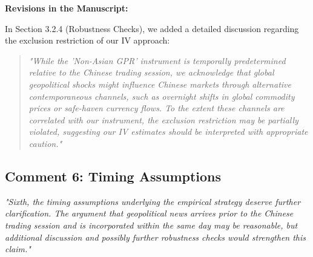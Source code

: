 \documentclass[12pt]{article}
\begin{document}
\begin{highlightbox}
\textbf{Revisions in the Manuscript:}

In Section 3.2.4 (Robustness Checks), we added a detailed discussion regarding the exclusion restriction of our IV approach:
\vspace{0.2cm}
\begin{quote}
\color{red}\itshape "While the 'Non-Asian GPR' instrument is temporally predetermined relative to the Chinese trading session, we acknowledge that global geopolitical shocks might influence Chinese markets through alternative contemporaneous channels, such as overnight shifts in global commodity prices or safe-haven currency flows. To the extent these channels are correlated with our instrument, the exclusion restriction may be partially violated, suggesting our IV estimates should be interpreted with appropriate caution."
\end{quote}
\end{highlightbox}

\subsection*{Comment 6: Timing Assumptions}
\textit{"Sixth, the timing assumptions underlying the empirical strategy deserve further clarification. The argument that geopolitical news arrives prior to the Chinese trading session and is incorporated within the same day may be reasonable, but additional discussion and possibly further robustness checks would strengthen this claim."}
\end{document}
